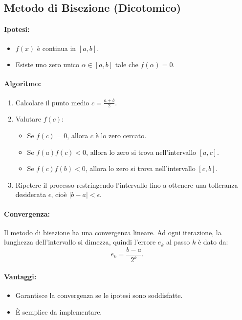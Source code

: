 \documentclass[a4paper, 11pt]{article}
\begin{document}
        \subsection{Metodo di Bisezione (Dicotomico)}
        \paragraph{Ipotesi:}
        \begin{itemize}
            \item \( f(x) \) è continua in \([a, b]\).
            \item Esiste uno zero unico \( \alpha \in [a, b] \) tale che \( f(\alpha) = 0 \).
        \end{itemize}

        \paragraph{Algoritmo:}
        \begin{enumerate}
            \item Calcolare il punto medio \( c = \frac{a + b}{2} \).
            \item Valutare \( f(c) \):
            \begin{itemize}
            \item Se \( f(c) = 0 \), allora \( c \) è lo zero cercato.
            \item Se \( f(a)f(c) < 0 \), allora lo zero si trova nell'intervallo \([a, c]\).
            \item Se \( f(c)f(b) < 0 \), allora lo zero si trova nell'intervallo \([c, b]\).
            \end{itemize}
            \item Ripetere il processo restringendo l'intervallo fino a ottenere una tolleranza desiderata \( \epsilon \), cioè \( |b - a| < \epsilon \).
        \end{enumerate}

        \paragraph{Convergenza:}
        Il metodo di bisezione ha una convergenza lineare. Ad ogni iterazione, la lunghezza dell'intervallo si dimezza, quindi l'errore \( e_k \) al passo \( k \) è dato da:
        \[
        e_k = \frac{b - a}{2^k}.
        \]

        \paragraph{Vantaggi:}
        \begin{itemize}
            \item Garantisce la convergenza se le ipotesi sono soddisfatte.
            \item È semplice da implementare.
        \end{itemize}
\end{document}
